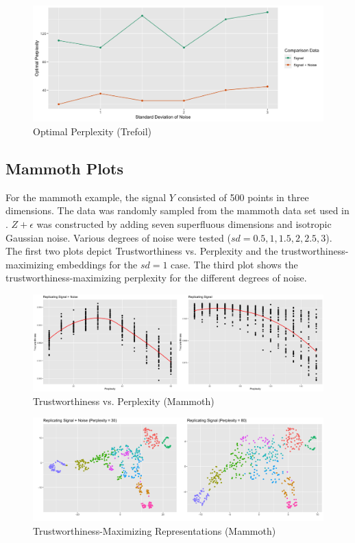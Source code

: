 \documentclass{article}
\begin{document}
\begin{figure}[H]
\centering
\includegraphics[scale=0.37]{optimal_perp_trefoil}
\caption{Optimal Perplexity (Trefoil)}
\end{figure}

\subsection{Mammoth Plots}
For the mammoth example, the signal $Y$ consisted of 500 points in three dimensions. The data was randomly sampled from the mammoth data set used in \cite{understanding DR}. $Z + \epsilon$ was constructed by adding seven superfluous dimensions and isotropic Gaussian noise. Various degrees of noise were tested ($sd = 0.5, 1, 1.5, 2, 2.5, 3$). The first two plots depict Trustworthiness vs. Perplexity and the trustworthiness-maximizing embeddings for the $sd = 1$ case. The third plot shows the trustworthiness-maximizing perplexity for the different degrees of noise.

\begin{figure}[H]
\centering
\includegraphics[scale=0.2]{trust_plot_mammoth}
\caption{Trustworthiness vs. Perplexity (Mammoth)}
\end{figure}

\begin{figure}[H]
\centering
\includegraphics[scale=0.28]{best_rep_mammoth}
\caption{Trustworthiness-Maximizing Representations (Mammoth)}
\end{figure}
\end{document}
